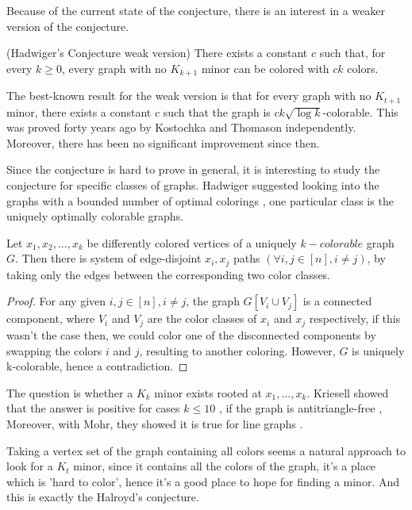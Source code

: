 Because of the current state of the conjecture, there is an interest in a weaker version of the conjecture.

\begin{conj} (Hadwiger's Conjecture weak version)
    There exists a constant $c$ such that, for every $k \geq 0$, every graph with no $K_{k+1}$ minor can be colored with $ck$ colors.
\end{conj}

The best-known result for the weak version is that for every graph with no $K_{t+1}$ minor, there exists a constant $c$ such that the graph is $ck\sqrt{\log{k}}$-colorable.
This was proved forty years ago by Kostochka \cite{Kostochka1984} and Thomason \cite{Thomason_1984} independently. Moreover, there has been no significant improvement since then.

Since the conjecture is hard to prove in general, it is interesting to study the conjecture for specific classes of graphs.
Hadwiger suggested looking into the graphs with a bounded number of optimal colorings \cite{hadwiger_1943}, 
one particular class is the uniquely optimally colorable graphs.

\begin{claim}
    Let $x_1, x_2, ..., x_k$ be differently colored vertices of a uniquely $k-colorable$ graph $G$. Then there is
    system of edge-disjoint $x_{i}, x_{j}$ paths $(\forall i, j \in [n], i \neq j)$, 
    by taking only the edges between the corresponding two color classes. 
\end{claim}


\begin{proof}
    For any given $i, j \in [n], i \neq j$, the graph $G[V_i \cup V_j]$ is a connected 
    component, where $V_i$ and $V_j$ are the color classes of $x_i$ and $x_j$ respectively, if this wasn't the case
    then, we could color one of the disconnected components by swapping the colors $i$ and $j$, resulting to another coloring. 
    However, $G$ is uniquely k-colorable, hence a contradiction.
\end{proof}

The question is whether a $K_k$ minor exists rooted at $x_1, ..., x_k$. Kriesell showed that the answer is positive for 
cases $k \leq 10$ \cite{Kriesell2021}, if the graph is antitriangle-free \cite{Kriesell2017}, 
Moreover, with Mohr, they showed it is true for line graphs \cite{Kriesell2021}.


Taking a vertex set of the graph containing all colors seems a natural approach to look for a $K_{t}$ minor, since it contains
all the colors of the graph, it's a place which is 'hard to color', hence it's a good place to hope for finding a minor. And this is 
exactly the Halroyd's conjecture.

